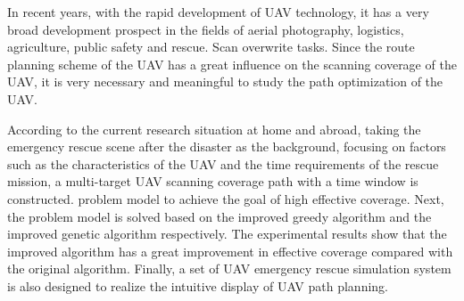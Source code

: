 \begin{eabstract}
  In recent years, with the rapid development of UAV technology, it has a very broad development prospect in the fields of aerial photography, logistics, agriculture, public safety and rescue. Scan overwrite tasks. Since the route planning scheme of the UAV has a great influence on the scanning coverage of the UAV, it is very necessary and meaningful to study the path optimization of the UAV.


  According to the current research situation at home and abroad, taking the emergency rescue scene after the disaster as the background, focusing on factors such as the characteristics of the UAV and the time requirements of the rescue mission, a multi-target UAV scanning coverage path with a time window is constructed. problem model to achieve the goal of high effective coverage. Next, the problem model is solved based on the improved greedy algorithm and the improved genetic algorithm respectively. The experimental results show that the improved algorithm has a great improvement in effective coverage compared with the original algorithm. Finally, a set of UAV emergency rescue simulation system is also designed to realize the intuitive display of UAV path planning.
\end{eabstract}
